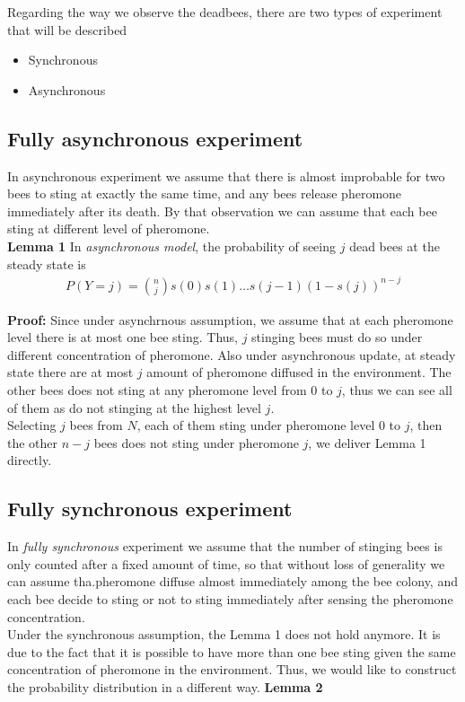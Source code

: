 \documentclass[12pt]{article}
\begin{document}
Regarding the way we observe the deadbees, there are two types of experiment
that will be described
\begin{itemize}
\item Synchronous
\item Asynchronous
\end{itemize}

\subsection{Fully asynchronous experiment}
In asynchronous experiment we assume that there is almost improbable for
two bees to sting at exactly the same time, and any bees release pheromone
immediately after its death. By that observation we can assume that each bee
sting at different level of pheromone.\\

\textbf{Lemma 1} In \textit{asynchronous model}, the probability of seeing $j$
dead bees at the steady state is
\begin{align}
  P(Y=j) = {n\choose j}s(0)s(1)\ldots s(j-1)(1 - s(j))^{n-j} 
\end{align}

\textbf{Proof:} Since under asynchrnous assumption, we assume that at each
pheromone level there is at most one bee sting. Thus, $j$ stinging bees must do
so under different concentration of pheromone. Also under asynchronous update,
at steady state there are at most $j$ amount of pheromone diffused in the
environment. The other bees does not sting at any pheromone level from $0$ to
$j$, thus we can see all of them as do not stinging at the highest level $j$.\\
Selecting $j$ bees from $N$, each of them sting under pheromone level $0$ to
$j$, then the other $n-j$ bees does not sting under pheromone $j$, we deliver
Lemma 1 directly.\\


\subsection{Fully synchronous experiment}
In \textit{fully synchronous} experiment we assume that the number of
stinging bees is only counted after a fixed amount of time, so that without loss
of generality we can assume tha.pheromone diffuse
almost immediately among the bee colony, and each bee decide to sting or not to
sting immediately after sensing the pheromone concentration.\\
Under the synchronous assumption, the Lemma 1 does not hold anymore. It is due
to the fact that it is possible to have more than one bee sting given the same
concentration of pheromone in the environment. Thus, we would like to construct
the probability distribution in a different way.
\textbf{Lemma 2}
\end{document}

